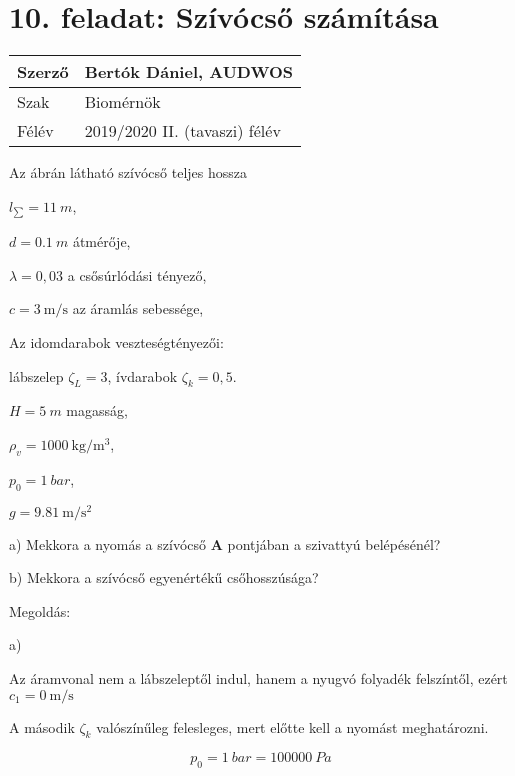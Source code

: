 \section*{10. feladat: Szívócső számítása}




\begin{tabular}{ | p{2cm} | p{14cm} | } 
	\hline
	Szerző & Bertók Dániel, AUDWOS \\ 
	\hline
	Szak & Biomérnök \\ 
	\hline
	Félév & 2019/2020 II. (tavaszi) félév \\ 
	\hline
\end{tabular}
\vspace{0.5cm}


\noindent Az ábrán látható szívócső teljes hossza

$l_\sum= \SI{11}{m}$,

$d= \SI{0,1}{m}$ átmérője,

$\lambda= 0,03$ a csősúrlódási tényező,

$c= \SI{3}{\meter\per\second}$ az áramlás sebessége,

Az idomdarabok veszteségtényezői:

lábszelep $\zeta_L= 3$, ívdarabok $\zeta_k= 0,5$.

$H= \SI{5}{m}$ magasság,

$\rho_v= \SI{1000}{\kilogram\per\meter\cubed}$,

$p_0= \SI{1}{bar}$,

$g= \SI{9,81}{\meter\per\second\squared}$ 

\noindent a) Mekkora a nyomás a szívócső \textbf{A} pontjában a szivattyú belépésénél?

\noindent b) Mekkora a szívócső egyenértékű csőhosszúsága?



\noindent\hrulefill


\noindent Megoldás:

\noindent a)

\noindent Az áramvonal nem a lábszeleptől indul, hanem a nyugvó folyadék felszíntől, ezért $c_1= \SI{0}{\meter\per\second}$

\noindent A második  $\zeta_k$ valószínűleg felesleges, mert előtte kell a nyomást meghatározni.

\begin{equation}
p_0=\SI{1}{bar}=\SI{100000}{Pa}
\end{equation}

